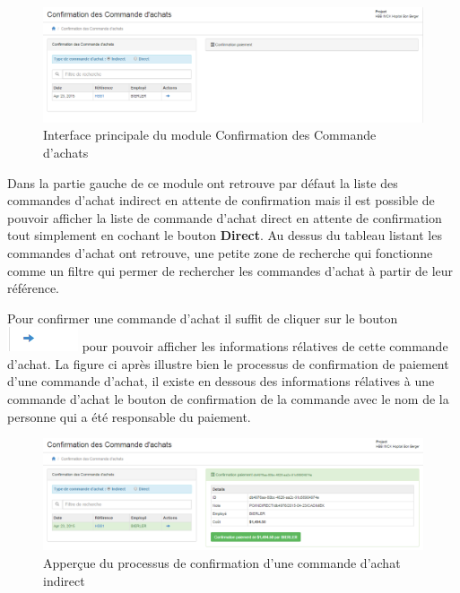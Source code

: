 \documentclass[12pt,a4paper]{report}
\begin{document}
\begin{figure}[h]
\begin{center}
\includegraphics[width=12cm]{pic/ConfPaieAchat.png}
\end{center}
\caption{Interface principale du module Confirmation des Commande d'achats}
\label{Interface principale du module Confirmation des Commande d'achats}
\end{figure}  

Dans la partie gauche de ce module ont retrouve par défaut la liste des commandes d'achat indirect en attente de confirmation mais il est possible de pouvoir afficher la liste de commande d'achat direct en attente de confirmation tout simplement en cochant le bouton \textbf{Direct}. Au dessus du tableau listant les commandes d'achat ont retrouve, une petite zone de recherche qui fonctionne comme un filtre qui permer de rechercher les commandes d'achat à partir de leur référence.

Pour confirmer une commande d'achat il suffit de cliquer sur le bouton \includegraphics[scale=0.7]{pic/BlueArrow.png} pour pouvoir afficher les informations rélatives de cette commande d'achat. La figure ci après illustre bien le processus de confirmation de paiement d'une commande d'achat, il existe en dessous des informations rélatives à une commande d'achat le bouton de confirmation  de la commande avec le nom de la personne qui a été responsable du paiement.

\begin{figure}[h]
\begin{center}
\includegraphics[width=12cm]{pic/ConfPOAchat.png}
\end{center}
\caption{Apperçue du processus de confirmation d'une commande d'achat indirect}
\label{Apperçue du processus de confirmation d'une commande d'achat indirect}
\end{figure} 
\end{document}
